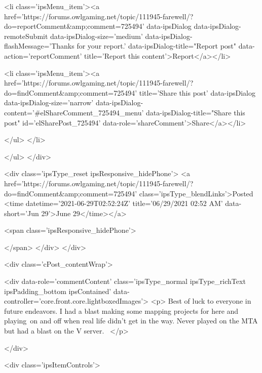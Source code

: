 							<li class='ipsMenu_item'><a href='https://forums.owlgaming.net/topic/111945-farewell/?do=reportComment&amp;comment=725494' data-ipsDialog data-ipsDialog-remoteSubmit data-ipsDialog-size='medium' data-ipsDialog-flashMessage='Thanks for your report.' data-ipsDialog-title="Report post" data-action='reportComment' title='Report this content'>Report</a></li>
						
						
							<li class='ipsMenu_item'><a href='https://forums.owlgaming.net/topic/111945-farewell/?do=findComment&amp;comment=725494' title='Share this post' data-ipsDialog data-ipsDialog-size='narrow' data-ipsDialog-content='#elShareComment_725494_menu' data-ipsDialog-title="Share this post" id='elSharePost_725494' data-role='shareComment'>Share</a></li>
						
                        
						
						
						
							
								
							
							
							
							
							
							
						
					</ul>
				</li>
				
			</ul>
		</div>

		<div class='ipsType_reset ipsResponsive_hidePhone'>
			<a href='https://forums.owlgaming.net/topic/111945-farewell/?do=findComment&amp;comment=725494' class='ipsType_blendLinks'>Posted <time datetime='2021-06-29T02:52:24Z' title='06/29/2021 02:52  AM' data-short='Jun 29'>June 29</time></a> 
			
			<span class='ipsResponsive_hidePhone'>
				
				
			</span>
		</div>
	</div>

	

    

	<div class='cPost_contentWrap'>
		
		<div data-role='commentContent' class='ipsType_normal ipsType_richText ipsPadding_bottom ipsContained' data-controller='core.front.core.lightboxedImages'>
			<p>
	Best of luck to everyone in future endeavors. I had a blast making some mapping projects for here and playing on and off when real life didn't get in the way. Never played on the MTA but had a blast on the V server. 
</p>


			
		</div>

		
			<div class='ipsItemControls'>
				
					
						

